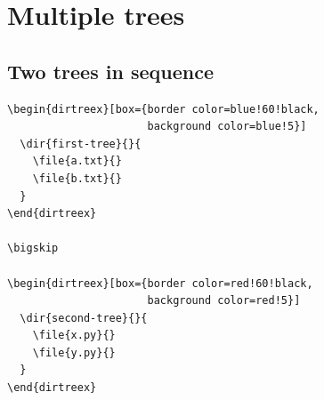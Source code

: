 \documentclass[11pt]{article}
\begin{document}
\begin{dirtreex}[elbow radius=2pt]
\end{dirtreex}

\clearpage

\section{Multiple trees}

\subsection{Two trees in sequence}

\begin{Verbatim}
\begin{dirtreex}[box={border color=blue!60!black,
                      background color=blue!5}]
  \dir{first-tree}{}{
    \file{a.txt}{}
    \file{b.txt}{}
  }
\end{dirtreex}

\bigskip

\begin{dirtreex}[box={border color=red!60!black,
                      background color=red!5}]
  \dir{second-tree}{}{
    \file{x.py}{}
    \file{y.py}{}
  }
\end{dirtreex}
\end{Verbatim}

\begin{dirtreex}[box={border color=blue!60!black,
                      background color=blue!5}]
\end{dirtreex}

\bigskip

\begin{dirtreex}[box={border color=red!60!black,
                      background color=red!5}]
\end{dirtreex}

\clearpage
\end{document}
